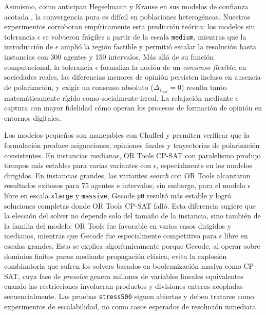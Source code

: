 \documentclass[10pt,letterpaper]{article}
\begin{document}
Asimismo, como anticipan Hegselmann y Krause en sus modelos de confianza acotada \cite{hegselmann-krause}, la convergencia pura es dif\'icil en poblaciones heterog\'eneas. Nuestros experimentos corroboran emp\'iricamente esta predicci\'on te\'orica: los modelos sin tolerancia \(\epsilon\) se volvieron fr\'agiles a partir de la escala \texttt{medium}, mientras que la introducci\'on de \(\epsilon\) ampli\'o la regi\'on factible y permiti\'o escalar la resoluci\'on hasta instancias con 300 agentes y 150 intervalos. M\'as all\'a de su funci\'on computacional, la tolerancia \(\epsilon\) formaliza la noci\'on de un \textit{consenso flexible}: en sociedades reales, las diferencias menores de opini\'on persisten incluso en ausencia de polarizaci\'on, y exigir un consenso absoluto (\(\Delta_{I_{end}} = 0\)) resulta tanto matem\'aticamente r\'igido como socialmente irreal. La relajaci\'on mediante \(\epsilon\) captura con mayor fidelidad c\'omo operan los procesos de formaci\'on de opini\'on en entornos digitales.

Los modelos peque\~nos son manejables con Chuffed y permiten verificar que la formulaci\'on produce asignaciones, opiniones finales y trayectorias de polarizaci\'on consistentes. En instancias medianas, OR Tools CP-SAT con paralelismo produjo tiempos m\'as estables para varias variantes con \(\epsilon\), especialmente en los modelos dirigidos. En instancias grandes, las variantes \textit{search} con OR Tools alcanzaron resultados exitosos para 75 agentes e intervalos; sin embargo, para el modelo \(\epsilon\) libre en escala \texttt{xlarge} y \texttt{massive}, Gecode \texttt{p0} result\'o m\'as estable y logr\'o soluciones completas donde OR Tools CP-SAT fall\'o. Esta diferencia sugiere que la elecci\'on del solver no depende solo del tama\~no de la instancia, sino tambi\'en de la familia del modelo: OR Tools fue favorable en varios casos dirigidos y medianos, mientras que Gecode fue especialmente competitivo para \(\epsilon\) libre en escalas grandes. Esto se explica algor\'itmicamente porque Gecode, al operar sobre dominios finitos puros mediante propagaci\'on cl\'asica, evita la explosi\'on combinatoria que sufren los solvers basados en booleanizaci\'on masiva como CP-SAT, cuya fase de \textit{presolve} genera millones de variables lineales equivalentes cuando las restricciones involucran productos y divisiones enteras acopladas secuencialmente. Las pruebas \texttt{stress500} siguen abiertas y deben tratarse como experimentos de escalabilidad, no como casos esperados de resoluci\'on inmediata.
\end{document}
